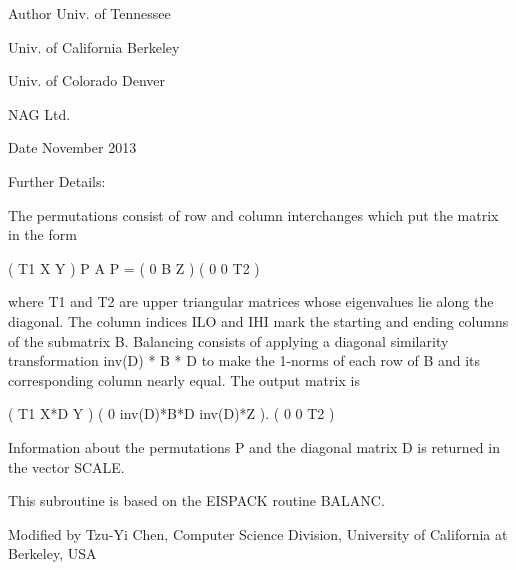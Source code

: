\begin{DoxyAuthor}{Author}
Univ. of Tennessee 

Univ. of California Berkeley 

Univ. of Colorado Denver 

N\+A\+G Ltd. 
\end{DoxyAuthor}
\begin{DoxyDate}{Date}
November 2013 
\end{DoxyDate}
\begin{DoxyParagraph}{Further Details\+: }
\begin{DoxyVerb}  The permutations consist of row and column interchanges which put
  the matrix in the form

             ( T1   X   Y  )
     P A P = (  0   B   Z  )
             (  0   0   T2 )

  where T1 and T2 are upper triangular matrices whose eigenvalues lie
  along the diagonal.  The column indices ILO and IHI mark the starting
  and ending columns of the submatrix B. Balancing consists of applying
  a diagonal similarity transformation inv(D) * B * D to make the
  1-norms of each row of B and its corresponding column nearly equal.
  The output matrix is

     ( T1     X*D          Y    )
     (  0  inv(D)*B*D  inv(D)*Z ).
     (  0      0           T2   )

  Information about the permutations P and the diagonal matrix D is
  returned in the vector SCALE.

  This subroutine is based on the EISPACK routine BALANC.

  Modified by Tzu-Yi Chen, Computer Science Division, University of
    California at Berkeley, USA\end{DoxyVerb}
 
\end{DoxyParagraph}
\hypertarget{group__doubleGEcomputational_ga14ddd93ddf8aa38daf5a0ce1f6052ce3}{}

